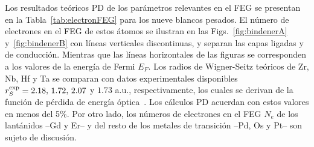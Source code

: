 Los resultados teóricos PD de los parámetros relevantes en el FEG se 
presentan en la Tabla~\ref{tab:electronFEG} para los nueve blancos 
pesados. El número de electrones en el FEG de estos átomos se ilustran 
en las Figs.~\ref{fig:bindenerA} y~\ref{fig:bindenerB} con líneas 
verticales discontinuas, y separan las capas ligadas y de conducción. 
Mientras que las líneas horizontales de las figuras se corresponden a 
los valores de la energía de Fermi $E_F$.
Los radios de Wigner-Seitz teóricos de Zr, Nb, Hf y Ta se comparan con 
datos experimentales disponibles 
$r_S^{\mbox{\scriptsize exp}}=2.18,\,1.72,\,2.07$ y $1.73$ a.u., 
respectivamente, los cuales se derivan de la función de pérdida de 
energía óptica~\cite{Werner:09,Lynch:75,Isaacson:75,Romaniello:06}.
Los cálculos PD acuerdan con estos valores en menos del 5\%. Por otro 
lado, los números de electrones en el FEG $N_e$ de los lantánidos --Gd y 
Er-- y del resto de los metales de transición --Pd, Os y Pt-- son sujeto 
de discusión. 


\begin{comment}
Mis cálculos:
Zr  rs=2.11  EF=0.413
Nb  rs=1.80  EF=0.569
Pd  rs=1.33  EF=1.033
Gd  rs=1.75  EF=0.602
Er  rs=1.52  EF=0.793
Hf  rs=2.08  EF=0.425
Ta  rs=1.80  EF=0.569
Os  rs=1.41  EF=0.921
Pt  rs=1.35  EF=1.015

Data from Strange et al

Gd teo 3.7063 1.8531
Er teo 3.6888 1.8444

Gd exp 3.7605 1.8802
Er exp 3.6713 1.8357

\end{comment}

